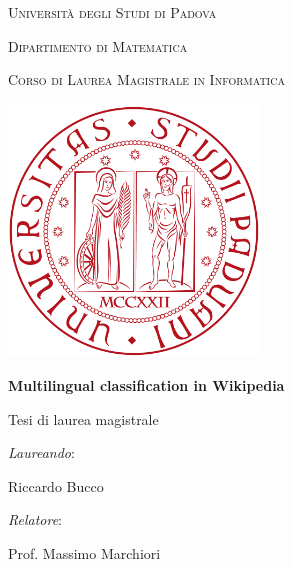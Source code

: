 \begin{titlepage}
	\thispagestyle{first_page_style}
	\centering
	\LARGE{\textsc{Università degli Studi di Padova}\par}
	\vspace{4mm}
	\large{\textsc{Dipartimento di Matematica }\par}
	\vspace{1mm}
	\large{\textsc{Corso di Laurea Magistrale in Informatica}\par}
	\vspace{15mm}
	\includegraphics[width=0.5\textwidth]{images/unipd.png}\par
	\vspace{20mm}
	\huge{\textbf{Multilingual classification in Wikipedia}\par}
	\vspace{10mm}
	\large{Tesi di laurea magistrale\par}
	\vfill
	\begin{minipage}{\textwidth}
		\begin{minipage}{0.49\textwidth}
			\raggedright
			\large{\textit{Laureando}:\par}
			\large{Riccardo Bucco}
		\end{minipage}
		\begin{minipage}{0.49\textwidth}
			\raggedleft
			\large{\textit{Relatore}:\par}
			\large{Prof. Massimo Marchiori\par}
		\end{minipage}\par
	\end{minipage}
	\vspace{7mm}
	\restoregeometry
\end{titlepage}